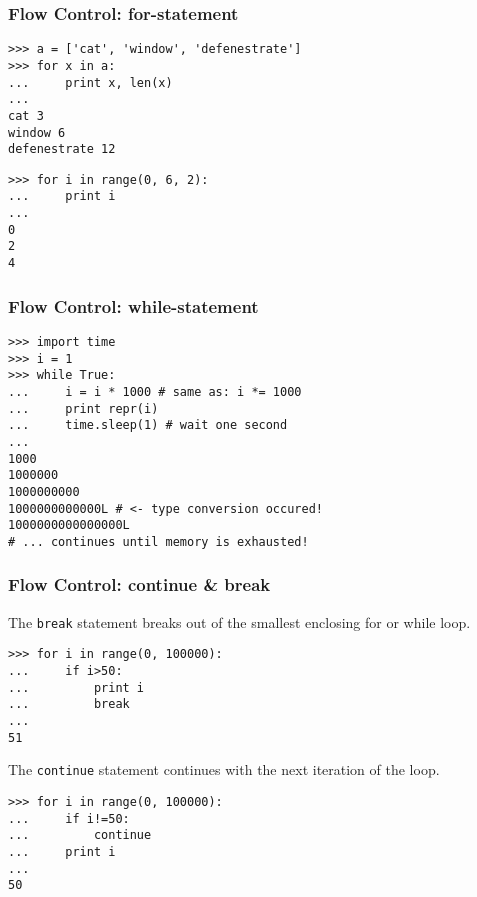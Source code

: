 \begin{frame}[fragile]
    \frametitle{Flow Control: for-statement}
    \begin{myColorBox}{0.9}{}
\begin{verbatim}
>>> a = ['cat', 'window', 'defenestrate']
>>> for x in a:
...     print x, len(x)
...
cat 3
window 6
defenestrate 12
\end{verbatim}
    \end{myColorBox}
    \pause
    \begin{myColorBox}{0.9}{}
\begin{verbatim}
>>> for i in range(0, 6, 2):
...     print i
...
0
2
4
\end{verbatim}
    \end{myColorBox}
\end{frame}


\begin{frame}[fragile]
    \frametitle{Flow Control: while-statement}
    \begin{myColorBox}{0.9}{}
\begin{verbatim}
>>> import time
>>> i = 1
>>> while True:
...     i = i * 1000 # same as: i *= 1000
...     print repr(i)
...     time.sleep(1) # wait one second
...
1000
1000000
1000000000
1000000000000L # <- type conversion occured!
1000000000000000L
# ... continues until memory is exhausted!
\end{verbatim}
    \end{myColorBox}
\end{frame}


\begin{frame}[fragile]
    \frametitle{Flow Control: continue \& break}
The \verb#break# statement breaks out of the smallest enclosing for or while loop.
    \begin{myColorBox}{0.9}{}
\begin{verbatim}
>>> for i in range(0, 100000):
...     if i>50:
...         print i
...         break
...
51
\end{verbatim}
    \end{myColorBox}
\pause
The \verb#continue# statement continues with the next iteration of the loop.
    \begin{myColorBox}{0.9}{}
\begin{verbatim}
>>> for i in range(0, 100000):
...     if i!=50:
...         continue
...     print i
...
50
\end{verbatim}
    \end{myColorBox}
\end{frame}


